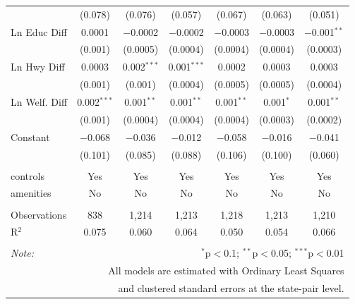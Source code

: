 \begin{table}[!htbp]
\begin{tabular}{@{\extracolsep{5pt}}lcccccc}
  & (0.078) & (0.076) & (0.057) & (0.067) & (0.063) & (0.051) \\ 
  Ln Educ Diff & 0.0001 & $-$0.0002 & $-$0.0002 & $-$0.0003 & $-$0.0003 & $-$0.001$^{**}$ \\ 
  & (0.001) & (0.0005) & (0.0004) & (0.0004) & (0.0004) & (0.0003) \\ 
  Ln Hwy Diff & 0.0003 & 0.002$^{***}$ & 0.001$^{***}$ & 0.0002 & 0.0003 & 0.0003 \\ 
  & (0.001) & (0.001) & (0.0004) & (0.0005) & (0.0005) & (0.0004) \\ 
  Ln Welf. Diff & 0.002$^{***}$ & 0.001$^{**}$ & 0.001$^{**}$ & 0.001$^{**}$ & 0.001$^{*}$ & 0.001$^{**}$ \\ 
  & (0.001) & (0.0004) & (0.0004) & (0.0004) & (0.0003) & (0.0002) \\ 
  Constant & $-$0.068 & $-$0.036 & $-$0.012 & $-$0.058 & $-$0.016 & $-$0.041 \\ 
  & (0.101) & (0.085) & (0.088) & (0.106) & (0.100) & (0.060) \\ 
 \hline \\[-1.8ex] 
controls & Yes & Yes & Yes & Yes & Yes & Yes \\ 
amenities & No & No & No & No & No & No \\ 
\hline \\[-1.8ex] 
Observations & 838 & 1,214 & 1,213 & 1,218 & 1,213 & 1,210 \\ 
R$^{2}$ & 0.075 & 0.060 & 0.064 & 0.050 & 0.054 & 0.066 \\ 
\hline 
\hline \\[-1.8ex] 
\textit{Note:}  & \multicolumn{6}{r}{$^{*}$p$<$0.1; $^{**}$p$<$0.05; $^{***}$p$<$0.01} \\ 
 & \multicolumn{6}{r}{All models are estimated with Ordinary Least Squares} \\ 
 & \multicolumn{6}{r}{and clustered standard errors at the state-pair level.} \\ 
\end{tabular} 
\end{table} 

